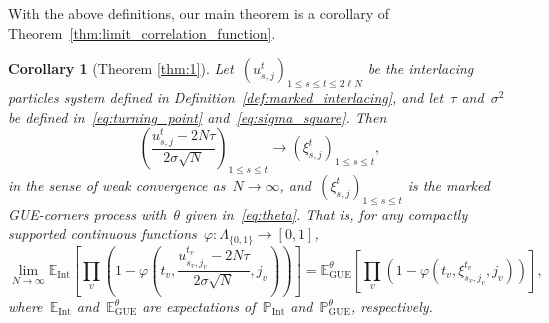 \documentclass[11pt]{article}
\theoremstyle{plain}
\newtheorem{corollary}[theorem]{Corollary}
\theoremstyle{definition}
\numberwithin{equation}{section}
\newcommand{\EE}{\mathbb{E}}
\newcommand{\PP}{\mathbb{P}}
\begin{document}
%
With the above definitions, our main theorem is a corollary of Theorem~\ref{thm:limit_correlation_function}.
% 
\begin{corollary}[Theorem \ref{thm:1}]\label{cor:week_converence}
Let~$(u_{s,j}^t)_{1\leq s\leq t\leq 2\ell N}$ be the interlacing particles system defined in Definition~\ref{def:marked_interlacing}, and let~$\tau $ and~$\sigma^2$ be defined in~\eqref{eq:turning_point} and~\eqref{eq:sigma_square}. Then
\begin{equation}
\left(\frac{u_{s,j}^{t}-2N\tau }{2\sigma\sqrt{N}}\right)_{1\leq s\leq t}\to \left(\xi_{s,j}^t\right)_{1\leq s\leq t},
\end{equation}
in the sense of weak convergence as~$N\to \infty$, and~$(\xi_{s,j}^t)_{1\leq s\leq t}$ is the marked GUE-corners process with~$\theta$ given in~\eqref{eq:theta}. That is, for any compactly supported continuous functions~$\varphi:\Lambda_{\{0,1\}}\to [0,1]$,
\begin{equation}
\lim_{N\to \infty}\EE_{\operatorname{Int}}\left[\prod_v \left(1-\varphi\left(t_v,\frac{u_{s_v,j_v}^{t_v}-2 N\tau }{2\sigma \sqrt{N}},j_v\right)\right)\right]
=\EE_{\operatorname{GUE}}^\theta\left[\prod_v (1-\varphi(t_v,\xi_{s_v,j_v}^{t_v},j_v))\right],
\end{equation}
where~$\EE_{\operatorname{Int}}$ and~$\EE_{\operatorname{GUE}}^\theta$ are expectations of~$\PP_{\operatorname{Int}}$ and~$\PP_{\operatorname{GUE}}^\theta$, respectively.
\end{corollary}
\end{document}
